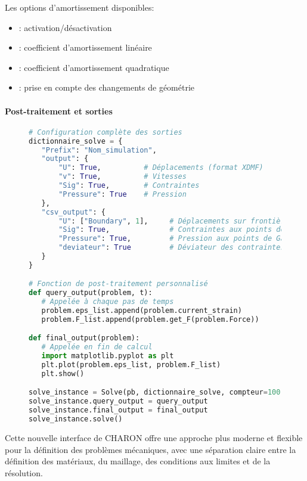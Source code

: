 \documentclass[10pt]{book}
\begin{document}
Les options d'amortissement disponibles:
\begin{itemize}
\item {}: activation/désactivation
\item {}: coefficient d'amortissement linéaire
\item {}: coefficient d'amortissement quadratique
\item {}: prise en compte des changements de géométrie
\end{itemize}

\paragraph{Post-traitement et sorties}

\begin{figure}[h!]
\begin{lstlisting}[language=python]
# Configuration complète des sorties
dictionnaire_solve = {
   "Prefix": "Nom_simulation",
   "output": {
       "U": True,          # Déplacements (format XDMF)
       "v": True,          # Vitesses
       "Sig": True,        # Contraintes
       "Pressure": True    # Pression
   },
   "csv_output": {
       "U": ["Boundary", 1],     # Déplacements sur frontière 1
       "Sig": True,              # Contraintes aux points de Gauss
       "Pressure": True,         # Pression aux points de Gauss
       "deviateur": True         # Déviateur des contraintes
   }
}

# Fonction de post-traitement personnalisé
def query_output(problem, t):
   # Appelée à chaque pas de temps
   problem.eps_list.append(problem.current_strain)
   problem.F_list.append(problem.get_F(problem.Force))

def final_output(problem):
   # Appelée en fin de calcul
   import matplotlib.pyplot as plt
   plt.plot(problem.eps_list, problem.F_list)
   plt.show()

solve_instance = Solve(pb, dictionnaire_solve, compteur=100, npas=1000)
solve_instance.query_output = query_output
solve_instance.final_output = final_output
solve_instance.solve()
\end{lstlisting}
\end{figure}

Cette nouvelle interface de CHARON offre une approche plus moderne et flexible pour la définition des problèmes mécaniques, avec une séparation claire entre la définition des matériaux, du maillage, des conditions aux limites et de la résolution.
\end{document}
